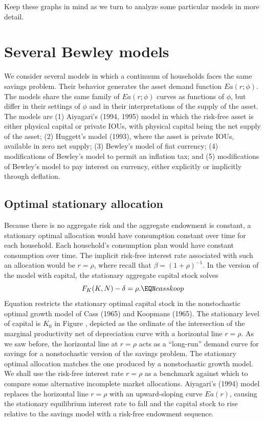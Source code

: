  Keep these graphs in mind as we turn to analyze
some particular models in more detail.

\supereject
\newpage


\section{Several Bewley models}

   We consider several models in which  a continuum of households faces the
same savings problem.  Their behavior generates the asset demand function $E a(r;\phi)$.
The models share the same family  of $E a(r;\phi)$ curves as functions of $\phi$, but differ in their
settings of $\phi$ and in their interpretations of the supply of the asset.
The models are (1) Aiyagari's (1994, 1995) model in which the risk-free asset
is either physical capital or private IOUs, with physical capital being the
net supply of the asset; (2) Huggett's model (1993), where the asset is private
IOUs, available in zero net supply; (3) Bewley's model of fiat currency;
(4) modifications of Bewley's model to permit an inflation tax;
and (5) modifications of Bewley's model to pay interest on currency,
either explicitly or implicitly through deflation.



\subsection{Optimal stationary allocation}

Because there is no aggregate
risk and the aggregate endowment is constant,
 a stationary optimal  allocation
would have consumption constant over time for each
household. Each household's  consumption plan would have constant
consumption over time.
The implicit risk-free interest rate associated with such an
allocation would be  $r = \rho$, where recall that $\beta = (1+\rho)^{-1}$.  In the version
of the model with capital, the stationary aggregate capital stock
solves
$$ F_K(K,N) - \delta =   \rho. \EQN casskoop  $$
Equation  restricts the stationary
optimal capital stock in the nonstochastic optimal
growth model of Cass (1965) and Koopmans (1965).
  The stationary
level of capital is  $K_0$ in Figure , depicted as the ordinate
of the intersection
of the marginal productivity net of depreciation  curve with
a horizontal line  $r = \rho$.   As we saw before,
the horizontal line at $r=\rho$ acts as a ``long-run'' demand
curve for savings for a nonstochastic version of the savings
problem.
   The stationary optimal allocation matches the one produced
by a nonstochastic growth model.
We shall use the risk-free interest rate $r=\rho$ as a benchmark against
which to compare some alternative incomplete market allocations.
    Aiyagari's (1994) model  replaces the horizontal
line  $r=\rho$ with an upward-sloping curve $E a(r)$, causing the stationary
equilibrium interest rate to fall  and the  capital stock to rise
relative to the  savings model with a risk-free endowment sequence.


